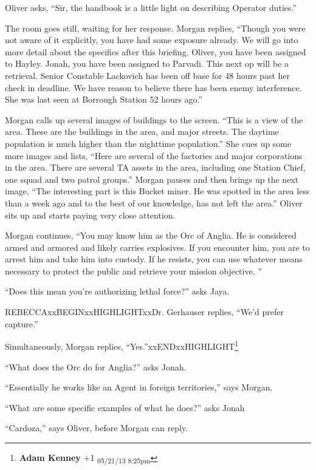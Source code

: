 Oliver asks, ``Sir, the handbook is a little light on describing Operator duties.''

The room goes still, waiting for her response.  Morgan replies, ``Though you were not aware of it explicitly, you have had some exposure already.  We will go into more detail about the specifics after this briefing.  Oliver, you have been assigned to Hayley.  Jonah, you have been assigned to Parvadi.  This next op will be a retrieval.  Senior Constable Lackovich has been off base for 48 hours past her check in deadline.  We have reason to believe there has been enemy interference.  She was last seen at Borrough Station 52 hours ago.''



Morgan calls up several images of buildings to the screen.  ``This is a view of the area.  These are the buildings in the area, and major streets.  The daytime population is much higher than the nighttime population.''  She cues up some more images and lists, ``Here are several of the factories and major corporations in the area.  There are several TA assets in the area, including one Station Chief, one squad and two patrol groups.''  Morgan pauses and then brings up the next image, ``The interesting part is this Bucket miner.  He was spotted in the area less than a week ago and to the best of our knowledge, has not left the area.''  Oliver sits up and starts paying very close attention.



Morgan continues, ``You may know him as the Orc of Anglia.  He is considered armed and armored and likely carries explosives.  If you encounter him, you are to arrest him and take him into custody.  If he resists, you can use whatever means necessary to protect the public and retrieve your mission objective. ''

``Does this mean you're authorizing lethal force?'' asks Jaya.

REBECCAxxBEGINxxHIGHLIGHTxxDr. Gerhauser replies, ``We'd prefer capture.''

Simultaneously, Morgan replies, ``Yes.''xxENDxxHIGHLIGHT\footnote{\textbf{Adam Kenney }+1 \textsubscript{05/21/13 8:25pm}}

``What does the Orc do for Anglia?'' asks Jonah.

``Essentially he works like an Agent in foreign territories,'' says Morgan.

``What are some specific examples of what he does?'' asks Jonah

``Cardoza,'' says Oliver, before Morgan can reply.

